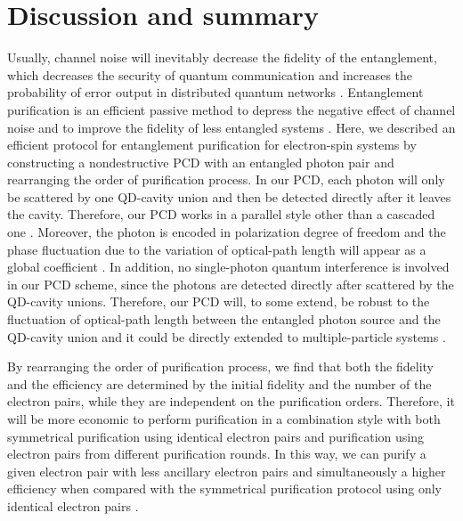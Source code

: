 \documentclass[aps,graphicx,twocolumn]{revtex4}%
\begin{document}
\section{Discussion and summary}


Usually, channel noise will inevitably decrease the fidelity of the entanglement, which  decreases the security of quantum communication and increases the probability of error output in distributed quantum networks \cite{QNsecure1,QNsecure2}. Entanglement purification is an efficient passive method to depress the negative effect of channel noise and to improve the fidelity of less entangled systems \cite{EPP1B}. Here, we described an efficient protocol for entanglement purification for electron-spin systems by constructing a nondestructive PCD with an entangled photon pair and rearranging the order of purification process. In our PCD, each photon will only be scattered by one QD-cavity union and then be detected directly after it leaves the cavity. Therefore, our PCD works in a parallel style other than a cascaded one \cite{QD22,QDpcd1}. Moreover, the photon is encoded in polarization degree of freedom and the phase fluctuation due to the variation of optical-path length will appear as a global  coefficient \cite{polarization}. In addition, no single-photon quantum interference is involved in our PCD scheme, since the photons are detected directly after scattered by the QD-cavity unions. Therefore, our PCD will, to some extend, be robust to the fluctuation of optical-path length \cite{Quaninternet} between the entangled photon source and the QD-cavity union and it could be directly extended to multiple-particle systems \cite{Mult00,Mult0,Mult1,Mult2}.


By rearranging the order of purification process, we find that both the fidelity and the efficiency are determined by the initial fidelity and the number of the electron pairs, while they are independent on the purification orders. Therefore, it will be more economic to perform purification in a combination style with both symmetrical purification using identical electron pairs and purification using electron pairs from different purification rounds. In this way, we can purify a given electron pair with less ancillary electron pairs and simultaneously a higher efficiency when compared with the  symmetrical purification protocol using only identical electron pairs \cite{EPP1B,Qerrer,EPPpan01,EPPpan2,EPPSheng1,EPPpdeng1,QDpcd1}.
\end{document}
